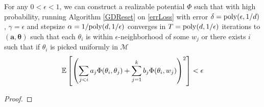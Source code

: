 \begin{theorem}
For any $0 < \epsilon < 1$, we can construct a realizable potential $\Phi$ such that with high probability, running Algorithm \ref{GDReset} on \eqref{errLoss} with error $\delta = \mathrm{poly}(\epsilon,1/d)$, $\gamma = \epsilon$ and stepsize $\alpha = 1/\mathrm{poly}(d,1/\epsilon)$ converges in $T = \mathrm{poly}(d, 1/\epsilon)$ iterations to $(\boldsymbol{a,\theta})$ such that each $\theta_i$ is within $\epsilon$-neighborhood of some $w_j$ or there exists $i$ such that if $\theta_i$ is picked uniformly in $\mathcal{M}$
%
\[ \operatorname*{\mathbb{E}}\left[\left( \sum_{j < i} a_j \Phi(\theta_i,\theta_j) + \sum_{j=1}^k b_j \Phi(\theta_i,w_j)\right)^2\right] < \epsilon\]
\end{theorem}

\begin{proof}


\end{proof}
\fi



